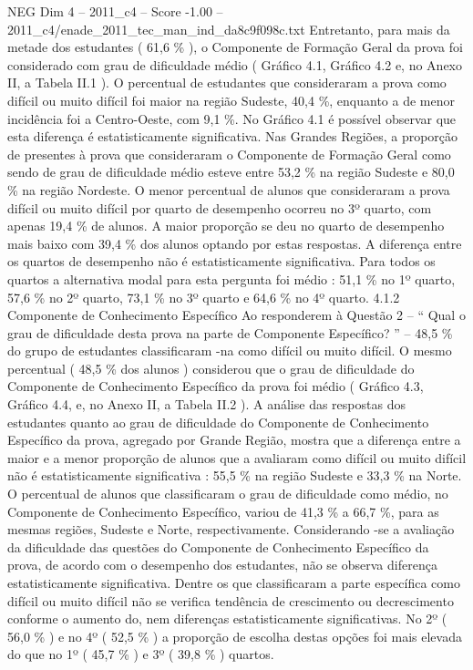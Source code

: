 \begin{textsample}{NEG Dim 4 – 2011\_c4 – Score -1.00 – 2011\_c4/enade\_2011\_tec\_man\_ind\_da8c9f098c.txt}
Entretanto, para mais da metade dos estudantes ( 61,6 \% ), o Componente de Formação Geral da prova foi considerado com grau de dificuldade médio ( Gráfico 4.1, Gráfico 4.2 e, no Anexo II, a Tabela II.1 ).
O percentual de estudantes que consideraram a prova como difícil ou muito difícil foi maior na região Sudeste, 40,4 \%, enquanto a de menor incidência foi a Centro-Oeste, com 9,1 \%.
No Gráfico 4.1 é possível observar que esta diferença é estatisticamente significativa.
Nas Grandes Regiões, a proporção de presentes à prova que consideraram o Componente de Formação Geral como sendo de grau de dificuldade médio esteve entre 53,2 \% na região Sudeste e 80,0 \% na região Nordeste.
O menor percentual de alunos que consideraram a prova difícil ou muito difícil por quarto de desempenho ocorreu no 3º quarto, com apenas 19,4 \% de alunos.
A maior proporção se deu no quarto de desempenho mais baixo com 39,4 \% dos alunos optando por estas respostas.
A diferença entre os quartos de desempenho não é estatisticamente significativa.
Para todos os quartos a alternativa modal para esta pergunta foi médio : 51,1 \% no 1º quarto, 57,6 \% no 2º quarto, 73,1 \% no 3º quarto e 64,6 \% no 4º quarto. 4.1.2 Componente de Conhecimento Específico Ao responderem à Questão 2 – “ Qual o grau de dificuldade desta prova na parte de Componente Específico? ” – 48,5 \% do grupo de estudantes classificaram -na como difícil ou muito difícil.
O mesmo percentual ( 48,5 \% dos alunos ) considerou que o grau de dificuldade do Componente de Conhecimento Específico da prova foi médio ( Gráfico 4.3, Gráfico 4.4, e, no Anexo II, a Tabela II.2 ).
A análise das respostas dos estudantes quanto ao grau de dificuldade do Componente de Conhecimento Específico da prova, agregado por Grande Região, mostra que a diferença entre a maior e a menor proporção de alunos que a avaliaram como difícil ou muito difícil não é estatisticamente significativa : 55,5 \% na região Sudeste e 33,3 \% na Norte.
O percentual de alunos que classificaram o grau de dificuldade como médio, no Componente de Conhecimento Específico, variou de 41,3 \% a 66,7 \%, para as mesmas regiões, Sudeste e Norte, respectivamente.
Considerando -se a avaliação da dificuldade das questões do Componente de Conhecimento Específico da prova, de acordo com o desempenho dos estudantes, não se observa diferença estatisticamente significativa.
Dentre os que classificaram a parte específica como difícil ou muito difícil não se verifica tendência de crescimento ou decrescimento conforme o aumento do, nem diferenças estatisticamente significativas.
No 2º ( 56,0 \% ) e no 4º ( 52,5 \% ) a proporção de escolha destas opções foi mais elevada do que no 1º ( 45,7 \% ) e 3º ( 39,8 \% ) quartos.

\end{textsample}
